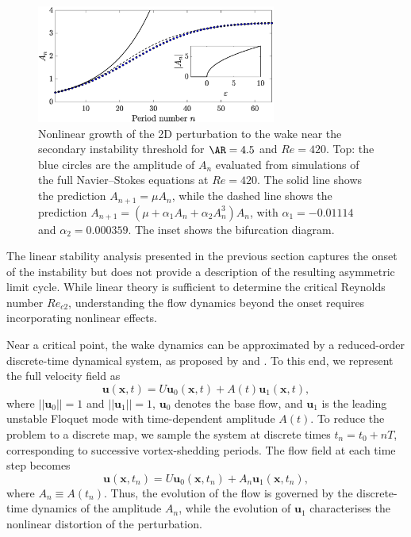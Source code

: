 \begin{figure}
  \centering
  \includegraphics[width=0.7\textwidth]{./fig/AR4p5/Nlgrowth_Re420.eps}
  \caption{Nonlinear growth of the 2D perturbation to the wake near the secondary instability threshold for $\AR=4.5$ and $Re=420$. Top: the blue circles are the amplitude of $A_n$ evaluated from simulations of the full Navier--Stokes equations at $Re=420$. The solid line shows the prediction $A_{n+1} = \mu A_n$, while the dashed line shows the prediction $A_{n+1} = ( \mu + \alpha_1 A_n + \alpha_2 A_n^3 ) A_n$, with $\alpha_1 = -0.01114$ and $\alpha_2 = 0.000359$. The inset shows the bifurcation diagram.}
  \label{fig:ar4p5_nnl}
\end{figure}

The linear stability analysis presented in the previous section captures the onset of the instability but does not provide a description of the resulting asymmetric limit cycle. While linear theory is sufficient to determine the critical Reynolds number $Re_{c2}$, understanding the flow dynamics beyond the onset requires incorporating nonlinear effects.

Near a critical point, the wake dynamics can be approximated by a reduced-order discrete-time dynamical system, as proposed by \cite{henderson-barkley-1996} and \cite{henderson-1997}. To this end, we represent the full velocity field as
%
\begin{equation}
\bm{u}(\bm{x}, t) = U \bm{u}_0(\bm{x}, t) + A(t) \bm{u}_1(\bm{x}, t),
\end{equation}
%
where $||\bm{u}_0||=1$ and $||\bm{u}_1||=1$, $\bm{u}_0$ denotes the base flow, and $\bm{u}_1$ is the leading unstable Floquet mode with time-dependent amplitude $A(t)$. To reduce the problem to a discrete map, we sample the system at discrete times $t_n = t_0 + nT$, corresponding to successive vortex-shedding periods. The flow field at each time step becomes
%
\begin{equation}
\bm{u}(\bm{x}, t_n) = U \bm{u}_0(\bm{x}, t_n) + A_n \bm{u}_1(\bm{x}, t_n),
\end{equation}
%
where $A_n \equiv A(t_n)$. Thus, the evolution of the flow is governed by the discrete-time dynamics of the amplitude $A_n$, while the evolution of $\bm{u}_1$ characterises the nonlinear distortion of the perturbation.


